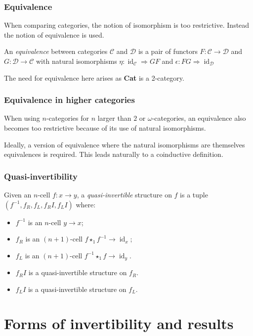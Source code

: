 \documentclass[presentation]{beamer}
\DeclareMathOperator{\id}{id}
\newcommand{\inv}[1]{#1^{-1}}
\newcommand{\comp}{\star}
\begin{document}
\begin{frame}
  \frametitle{Equivalence}
  When comparing categories, the notion of isomorphism is too restrictive. Instead the notion of equivalence is used.

  \pause{}
  \begin{definition}
    An \emph{equivalence} between categories \(\mathcal C\) and \(\mathcal D\) is a pair of functors \(F : \mathcal C \to \mathcal D\) and \(G : \mathcal D \to \mathcal C\) with natural isomorphisms \(\eta : \id_{\mathcal C} \Rightarrow GF\) and \(\epsilon : FG \Rightarrow \id_{\mathcal D}\)
  \end{definition}

  \pause{}
  The need for equivalence here arises as \textbf{Cat} is a 2-category.
\end{frame}

\begin{frame}
  \frametitle{Equivalence in higher categories}
  When using \(n\)-categories for \(n\) larger than \(2\) or \(\omega\)-categories, an equivalence also becomes too restrictive because of its use of natural isomorphisms.

  \pause{}
  Ideally, a version of equivalence where the natural isomorphisms are themselves equivalences is required. This leads naturally to a coinductive definition.
\end{frame}

\begin{frame}
  \frametitle{Quasi-invertibility}
  \begin{definition}
    Given an \(n\)-cell \(f : x \to y\), a \emph{quasi-invertible} structure on \(f\) is a tuple \((\inv f, f_R, f_L, f_R{}I, f_L{}I)\) where:
    \begin{itemize}
    \item \(\inv f\) is an \(n\)-cell \(y \to x\);
    \item \(f_R\) is an \((n+1)\)-cell \(f \comp_1 \inv f \to \id_x\);
    \item \(f_L\) is an \((n+1)\)-cell \(\inv f \comp_1 f \to \id_y\).
    \item \(f_R{}I\) is a quasi-invertible structure on \(f_R\).
    \item \(f_L{}I\) is a quasi-invertible structure on \(f_L\).
    \end{itemize}
  \end{definition}
\end{frame}

\section{Forms of invertibility and results}
\end{document}
